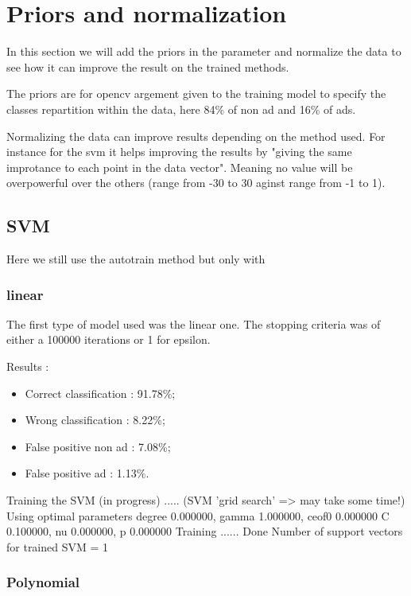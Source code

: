\section{Priors and normalization}

In this section we will add the priors in the parameter and normalize the data to see how it can improve the result on the trained methods.

The priors are for opencv argement given to the training model to specify the classes repartition within the data, here 84\% of non ad and 16\% of ads.

Normalizing the data can improve results depending on the method used. For instance for the svm it helps improving the results by "giving the same improtance to each point in the data vector". Meaning no value will be overpowerful over the others (range from -30 to 30 aginst range from -1 to 1).

\subsection{SVM}

Here we still use the autotrain method but only with


\subsubsection{linear}

The first type of model used was the linear one. The stopping criteria was of either a 100000 iterations or 1 for epsilon.

Results :
\begin{itemize}
  \item Correct classification : 91.78\%;
  \item Wrong classification : 8.22\%;
  \item False positive non ad : 7.08\%;
  \item False positive ad : 1.13\%.
\end{itemize}

Training the SVM (in progress) ..... (SVM 'grid search' => may take some time!)
Using optimal parameters degree 0.000000, gamma 1.000000, ceof0 0.000000
	 C 0.100000, nu 0.000000, p 0.000000
 Training ...... Done
Number of support vectors for trained SVM = 1

\subsubsection{Polynomial}

